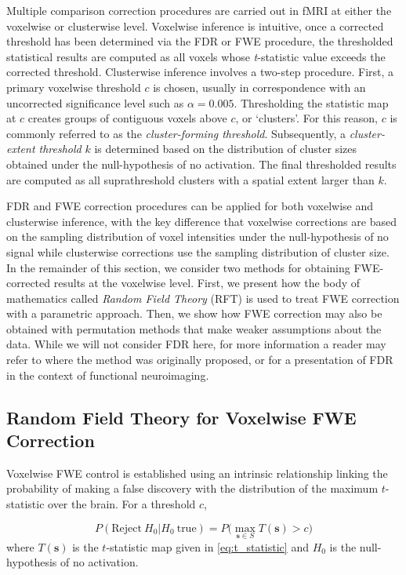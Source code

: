 Multiple comparison correction procedures are carried out in fMRI at either the voxelwise or clusterwise level. Voxelwise inference is intuitive, once a corrected threshold has been determined via the FDR or FWE procedure, the thresholded statistical results are computed as all voxels whose \textit{t}-statistic value exceeds the corrected threshold. Clusterwise inference involves a two-step procedure. First, a primary voxelwise threshold $c$ is chosen, usually in correspondence with an uncorrected significance level such as $\alpha = 0.005$. Thresholding the statistic map at $c$ creates groups of contiguous voxels above $c$, or `clusters'. For this reason, $c$ is commonly referred to as the \textit{cluster-forming threshold}. Subsequently, a \textit{cluster-extent threshold} $k$ is determined based on the distribution of cluster sizes obtained under the null-hypothesis of no activation. The final thresholded results are computed as all suprathreshold clusters with a spatial extent larger than $k$. 

FDR and FWE correction procedures can be applied for both voxelwise and clusterwise inference, with the key difference that voxelwise corrections are based on the sampling distribution of voxel intensities under the null-hypothesis of no signal while clusterwise corrections use the sampling distribution of cluster size. In the remainder of this section, we consider two methods for obtaining FWE-corrected results at the voxelwise level. First, we present how the body of mathematics called \textit{Random Field Theory} (RFT) is used to treat FWE correction with a parametric approach. Then, we show how FWE correction may also be obtained with permutation methods that make weaker assumptions about the data. While we will not consider FDR here, for more information a reader may refer to \citet*{Benjamini1995-yy} where the method was originally proposed, or \citet*{Genovese2002-xm} for a presentation of FDR in the context of functional neuroimaging. 

\subsection{Random Field Theory for Voxelwise FWE Correction}
\label{sec:RFT}

Voxelwise FWE control is established using an intrinsic relationship linking the probability of making a false discovery with the distribution of the maximum $t$-statistic over the brain. For a threshold $c$,

\begin{equation}
\label{eq:FWE_and_global_maximum}
P(\text{Reject} \ H_{0} | H_{0} \ \text{true}) = P\Big(\max\limits_{\bm{s} \in S} T(\bm{s}) > c \Big)
\end{equation}
where $T(\bm{s})$ is the $t$-statistic map given in \ref{eq:t_statistic} and $H_{0}$ is the null-hypothesis of no activation.

